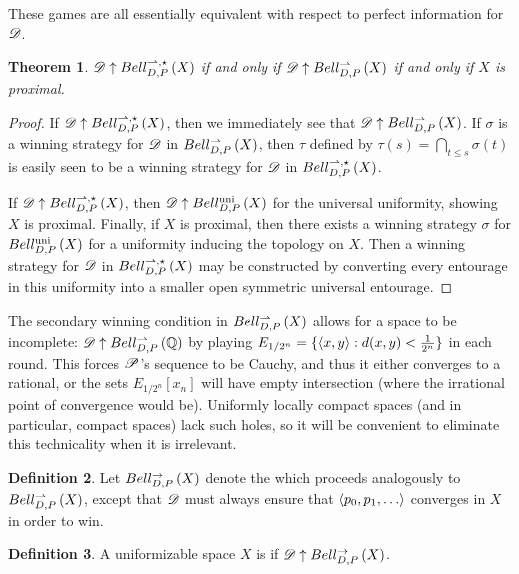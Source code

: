 \documentclass{amsart}
\newtheorem{theorem}{Theorem}[section]
\theoremstyle{definition}
\newtheorem{definition}[theorem]{Definition}
\begin{document}
  These games are all essentially equivalent with respect to perfect
  information for \(\mathscr{D}\).

  \begin{theorem}
    \(\mathscr{D}\uparrow Bell_{D,P}^{\rightharpoonup,\star}\left({X}\right)\) if and only if
    \(\mathscr{D}\uparrow Bell_{D,P}^{\rightharpoonup}\left({X}\right)\) if and only if
    \(X\) is proximal.
  \end{theorem}

  \begin{proof}
    If \(\mathscr{D}\uparrow Bell_{D,P}^{\rightharpoonup,\star}\left({X}\right)\), then we immediately see that
    \(\mathscr{D}\uparrow Bell_{D,P}^{\rightharpoonup}\left({X}\right)\).
    If \(\sigma\) is a winning strategy for \(\mathscr{D}\)
    in \(Bell_{D,P}^{\rightharpoonup}\left({X}\right)\), then \(\tau\) defined by
    \(\tau(s)=\bigcap_{t\leq s}\sigma(t)\) is easily seen to be a winning
    strategy for \(\mathscr{D}\) in \(Bell_{D,P}^{\rightharpoonup,\star}\left({X}\right)\).

    If \(\mathscr{D}\uparrow Bell_{D,P}^{\rightharpoonup,\star}\left({X}\right)\), then \(\mathscr{D}\uparrow Bell_{D,P}^{\textrm{uni}}\left({X}\right)\)
    for the universal uniformity, showing \(X\) is proximal.
    Finally, if \(X\) is proximal, then there exists a winning strategy
    \(\sigma\) for \(Bell_{D,P}^{\textrm{uni}}\left({X}\right)\) for a uniformity inducing the
    topology on \(X\). Then a winning strategy for \(\mathscr{D}\) in
    \(Bell_{D,P}^{\rightharpoonup,\star}\left({X}\right)\) may be constructed by converting every
    entourage in this uniformity into a smaller open symmetric universal
    entourage.
  \end{proof}

  The secondary winning condition in \(Bell_{D,P}^{\rightharpoonup}\left({X}\right)\)
  allows for a space to be incomplete: \(\mathscr{D}\uparrow Bell_{D,P}^{\rightharpoonup}\left({\mathbb{Q}}\right)\) by
  playing \(E_{1/2^n}=\{\langle x,y\rangle:d(x,y)<\frac{1}{2^n}\}\) in each round. This
  forces \(\mathscr{P}\)'s sequence to be Cauchy, and thus it either converges to
  a rational, or the sets \(E_{1/2^n}[x_n]\) will have empty intersection
  (where the irrational point of convergence would be). Uniformly locally
  compact spaces (and in particular, compact spaces) lack such holes, so it
  will be convenient to eliminate this technicality when it is irrelevant.

  \begin{definition}
    Let \(Bell_{D,P}^{\to}\left({X}\right)\) denote the
     which
    proceeds analogously to \(Bell_{D,P}^{\rightharpoonup}\left({X}\right)\), except
    that \(\mathscr{D}\) must always ensure that \(\<p_0,p_1,\dots\>\) converges
    in \(X\) in order to win.
  \end{definition}

  \begin{definition}
    A uniformizable space \(X\) is  if
    \(\mathscr{D} \uparrow Bell_{D,P}^{\to}\left({X}\right)\).
  \end{definition}
\end{document}
